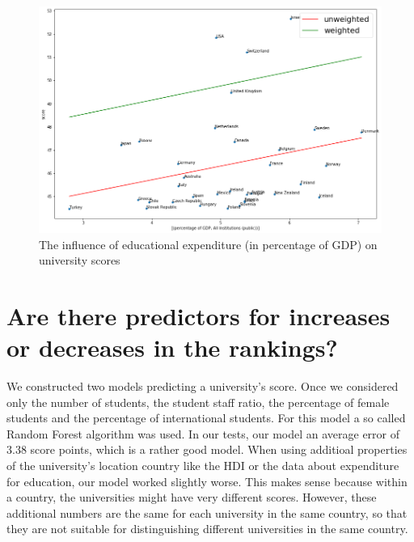 \documentclass{article}
\begin{document}
\begin{figure}[H]
	\centering
	\caption{The influence of educational expenditure (in percentage of GDP) on university scores}
	\includegraphics[width=0.75\linewidth]{graphs/exp_mean_all}
	
\end{figure}

\section*{\large{Are there predictors for increases or decreases in the rankings?}}
We constructed two models predicting a university's score. Once we considered only the number of students, the student staff ratio, the percentage of female students and the percentage of international students. For this model a so called Random Forest algorithm was used. In our tests, our model an average error of 3.38 score points, which is a rather good model. When using additioal properties of the university's location country like the HDI or the data about expenditure for education, our model worked slightly worse. This makes sense because within a country, the universities might have very different scores. However, these additional numbers are the same for each university in the same country, so that they are not suitable for distinguishing different universities in the same country.
\end{document}
